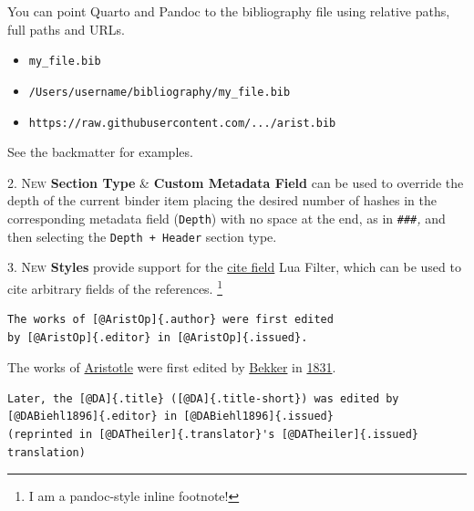\documentclass[
  12pt,
  a4paper,
  oneside]{scrbook}
\providecommand{\tightlist}{%
  \setlength{\itemsep}{0pt}\setlength{\parskip}{0pt}}\usepackage{longtable,booktabs,array}
\begin{document}
\begin{tcolorbox}[enhanced jigsaw, titlerule=0mm, colframe=quarto-callout-important-color-frame, opacitybacktitle=0.6, colback=white, colbacktitle=quarto-callout-important-color!10!white, opacityback=0, title=\textcolor{quarto-callout-important-color}{\faExclamation}\hspace{0.5em}{Important}, toprule=.15mm, left=2mm, bottomtitle=1mm, rightrule=.15mm, bottomrule=.15mm, breakable, toptitle=1mm, leftrule=.75mm, arc=.35mm, coltitle=black]

You can point Quarto and Pandoc to the bibliography file using relative
paths, full paths and URLs.

\begin{itemize}
\tightlist
\item
  \texttt{my\_file.bib}
\item
  \texttt{/Users/username/bibliography/my\_file.bib}
\item
  \texttt{https://raw.githubusercontent.com/.../arist.bib}
\end{itemize}

\end{tcolorbox}

See the backmatter for examples.

\textsc{2. New} \textbf{Section Type} \& \textbf{Custom Metadata Field}
can be used to override the depth of the current binder item placing the
desired number of hashes in the corresponding metadata field
(\texttt{Depth}) with no space at the end, as in \texttt{\#\#\#}\emph{,}
and then selecting the \texttt{Depth\ +\ Header} section type.

\textsc{3. New} \textbf{Styles} provide support for the
\href{https://github.com/bcdavasconcelos/citefield}{cite field} Lua
Filter, which can be used to cite arbitrary fields of the references.
\footnote{I am a pandoc-style inline footnote!}

\begin{verbatim}
The works of [@AristOp]{.author} were first edited 
by [@AristOp]{.editor} in [@AristOp]{.issued}.  
\end{verbatim}

The works of
\protect\hypertarget{cite_37}{}{\label{cite_37}\protect\hyperlink{ref-AristOp}{Aristotle}}
were first edited by
\protect\hypertarget{cite_38}{}{\label{cite_38}\protect\hyperlink{ref-AristOp}{Bekker}}
in
\protect\hypertarget{cite_39}{}{\label{cite_39}\protect\hyperlink{ref-AristOp}{1831}}.

\begin{verbatim}
Later, the [@DA]{.title} ([@DA]{.title-short}) was edited by 
[@DABiehl1896]{.editor} in [@DABiehl1896]{.issued} 
(reprinted in [@DATheiler]{.translator}'s [@DATheiler]{.issued} translation)
\end{verbatim}
\end{document}
